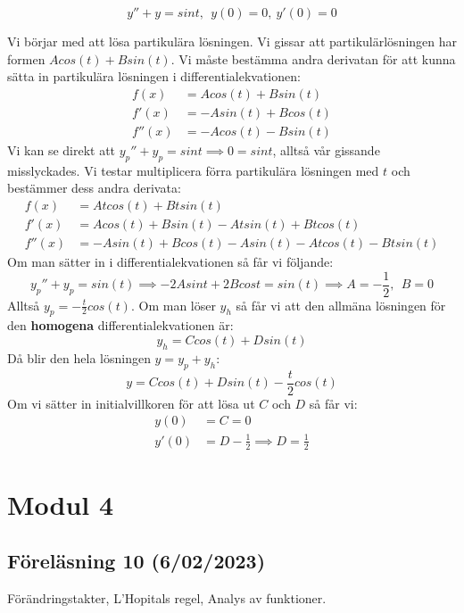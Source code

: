 \documentclass{report}
\begin{document}
\pagebreak
{}
{
\begin{equation*}
y''+y = sint,\:\: y(0) = 0,\:y'(0) = 0 
\end{equation*}

\sol Vi börjar med att lösa partikulära lösningen. Vi gissar att partikulärlösningen har formen $ Acos(t) + Bsin(t) $. Vi måste bestämma andra derivatan för att kunna sätta in partikulära lösningen i differentialekvationen:
\begin{align*}
	f(x) &= Acos(t)+Bsin(t)\\
	f'(x) &= -Asin(t)+Bcos(t)\\
	f''(x) &= -Acos(t)-Bsin(t)
\end{align*}
Vi kan se direkt att $ y_p''+y_p = sint \implies 0 = sint $, alltså vår gissande misslyckades. Vi testar multiplicera förra partikulära lösningen med $ t $ och bestämmer dess andra derivata:
\begin{align*}
	f(x) &= Atcos(t) + Btsin(t)\\
	f'(x) &= Acos(t) + Bsin(t) - Atsin(t) + Btcos(t)\\
	f''(x) &= -Asin(t)+Bcos(t)-Asin(t)-Atcos(t)-Btsin(t)
\end{align*}
Om man sätter in i differentialekvationen så får vi följande:
\begin{equation*}
y_p''+y_p = sin(t) \implies -2Asint+2Bcost = sin(t) \implies A = - \frac{1}{2},\:\: B = 0
\end{equation*}
Alltså $ y_p = - \frac{t}{2} cos(t) $. Om man löser $ y_h $ så får vi att den allmäna lösningen för den \textbf{homogena} differentialekvationen är:
\begin{equation*}
y_h = Ccos(t)+Dsin(t)
\end{equation*}
Då blir den hela lösningen $ y = y_p + y_h $:
\begin{equation*}
y = Ccos(t) + Dsin(t)- \frac{t}{2} cos(t)
\end{equation*}
Om vi sätter in initialvillkoren för att lösa ut $ C $ och $ D $ så får vi:
\begin{align*}
	y(0) &= C = 0\\
	y'(0) &= D - \frac{1}{2}  \implies  D = \frac{1}{2}  
	\end{align*}
}

\pagebreak
\chapter{Modul 4}
\section{Föreläsning 10 (6/02/2023)}
Förändringstakter, L'Hopitals regel, Analys av funktioner.\\\\
\end{document}

